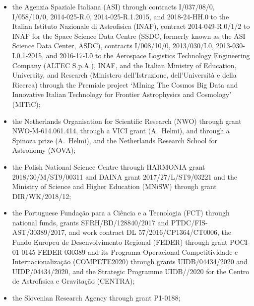 \documentclass[longauth]{aa}
\begin{document}
\begin{appendix}
\begin{itemize}
\item the Agenzia Spaziale Italiana (ASI) through contracts I/037/08/0, I/058/10/0, 2014-025-R.0, 2014-025-R.1.2015, and 2018-24-HH.0 to the Italian Istituto Nazionale di Astrofisica (INAF), contract 2014-049-R.0/1/2 to INAF for the Space Science Data Centre (SSDC, formerly known as the ASI Science Data Center, ASDC), contracts I/008/10/0, 2013/030/I.0, 2013-030-I.0.1-2015, and 2016-17-I.0 to the Aerospace Logistics Technology Engineering Company (ALTEC S.p.A.), INAF, and the Italian Ministry of Education, University, and Research (Ministero dell'Istruzione, dell'Universit\`{a} e della Ricerca) through the Premiale project `MIning The Cosmos Big Data and Innovative Italian Technology for Frontier Astrophysics and Cosmology' (MITiC);
\item the Netherlands Organisation for Scientific Research (NWO) through grant NWO-M-614.061.414, through a VICI grant (A.~Helmi), and through a Spinoza prize (A.~Helmi), and the Netherlands Research School for Astronomy (NOVA);
\item the Polish National Science Centre through HARMONIA grant 2018/30/M/ST9/00311 and DAINA grant 2017/27/L/ST9/03221 and the Ministry of Science and Higher Education (MNiSW) through grant DIR/WK/2018/12;
\item the Portuguese Funda\c{c}\~{a}o para a Ci\^{e}ncia e a Tecnologia (FCT) through national funds, grants SFRH/\-BD/128840/2017 and PTDC/FIS-AST/30389/2017, and work contract DL 57/2016/CP1364/CT0006, the Fundo Europeu de Desenvolvimento Regional (FEDER) through grant POCI-01-0145-FEDER-030389 and its Programa Operacional Competitividade e Internacionaliza\c{c}\~{a}o (COMPETE2020) through grants UIDB/04434/2020 and UIDP/04434/2020, and the Strategic Programme UIDB//2020 for the Centro de Astrof\'{\i}sica e Gravita\c{c}\~{a}o (CENTRA);  
\item the Slovenian Research Agency through grant P1-0188;

\end{itemize}
\end{appendix}
\end{document}

